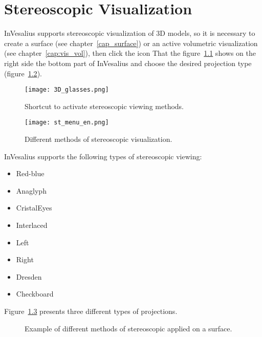 \chapter{Stereoscopic Visualization}

InVesalius supports stereoscopic visualization of 3D models, so it is necessary to create a surface (see chapter~\ref{cap_surface}) or an active volumetric visualization (see chapter~\ref{cap:vis_vol}), then click the icon That the figure~\ref{fig:ster} shows on the right side the bottom part of InVesalius and choose the desired projection type (figure~\ref{fig:st_menu}).


\begin{figure}[!htb]
\centering
\texttt{[image: 3D\_glasses.png]}
\caption{Shortcut to activate stereoscopic viewing methods.}
\label{fig:ster}
\end{figure}

\begin{figure}[!htb]
\centering
\texttt{[image: st\_menu\_en.png]}
\caption{Different methods of stereoscopic visualization.}
\label{fig:st_menu}
\end{figure}

InVesalius supports the following types of stereoscopic viewing:

\begin{itemize}
	\item Red-blue
	\item Anaglyph
	\item CristalEyes
	\item Interlaced
	\item Left
	\item Right
	\item Dresden
	\item Checkboard
\end{itemize}

Figure~\ref{fig:st_surf_methods} presents three different types of projections.


\begin{figure}[!htb]
  \centering
   \qquad
   \qquad
  \hfill
  \caption{Example of different methods of stereoscopic applied on a surface.}
  \label{fig:st_surf_methods}
\end{figure}